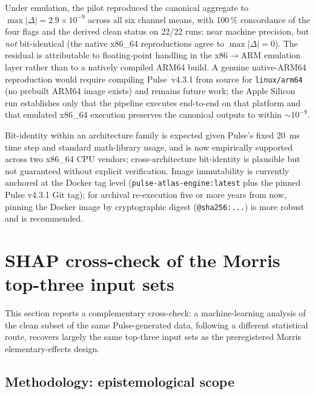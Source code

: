\documentclass[pdflatex,sn-nature]{sn-jnl}%
\begin{document}
Under emulation, the pilot reproduced the canonical aggregate to $\max|\Delta| = 2.9\times10^{-9}$ across all six channel means, with 100\,\% concordance of the four flags and the derived clean status on 22/22 runs: near machine precision, but \emph{not} bit-identical (the native x86\_64 reproductions agree to $\max|\Delta| = 0$). The residual is attributable to floating-point handling in the x86$\rightarrow$ARM emulation layer rather than to a natively compiled ARM64 build. A genuine native-ARM64 reproduction would require compiling Pulse~v4.3.1 from source for \texttt{linux/arm64} (no prebuilt ARM64 image exists) and remains future work; the Apple Silicon run establishes only that the pipeline executes end-to-end on that platform and that emulated x86\_64 execution preserves the canonical outputs to within $\sim 10^{-9}$.

Bit-identity within an architecture family is expected given Pulse's fixed 20~ms time step and standard math-library usage, and is now empirically supported across two x86\_64 CPU vendors; cross-architecture bit-identity is plausible but not guaranteed without explicit verification. Image immutability is currently anchored at the Docker tag level (\texttt{pulse-atlas-engine:latest} plus the pinned Pulse v4.3.1 Git tag); for archival re-execution five or more years from now, pinning the Docker image by cryptographic digest (\texttt{@sha256:...}) is more robust and is recommended.


\section{SHAP cross-check of the Morris top-three input sets}\label{sec:s13}

This section reports a complementary cross-check: a machine-learning analysis of the clean subset of the same Pulse-generated data, following a different statistical route, recovers largely the same top-three input sets as the preregistered Morris elementary-effects design.

\subsection{Methodology: epistemological scope}\label{sec:s13-scope}
\end{document}
